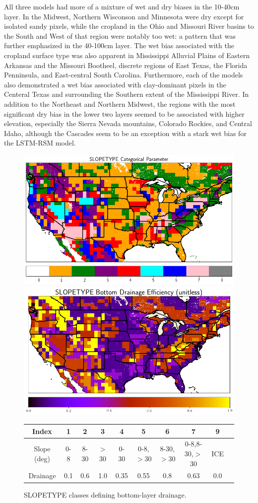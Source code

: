 All three models had more of a mixture of wet and dry biases in the 10-40cm layer. In the Midwest, Northern Wisconson and Minnesota were dry except for isolated sandy pixels, while the cropland in the Ohio and Missouri River basins to the South and West of that region were notably too wet: a pattern that was further emphasized in the 40-100cm layer. The wet bias associated with the cropland surface type was also apparent in Mississippi Alluvial Plains of Eastern Arkansas and the Missouri Bootheel, discrete regions of East Texas, the Florida Penninsula, and East-central South Carolina. Furthermore, each of the models also demonstrated a wet bias associated with clay-dominant pixels in the Centeral Texas and surrounding the Southern extent of the Mississippi River. In addition to the Northeast and Northern Midwest, the regions with the most significant dry bias in the lower two layers seemed to be associated with higher elevation, especially the Sierra Nevada mountains, Colorado Rockies, and Central Idaho, although the Cascades seem to be an exception with a stark wet bias for the LSTM-RSM model.

\begin{figure}[h!]
    \centering
    \includegraphics[width=.48\linewidth,draft=false]{figures/static_slopetype_3km.png}
    \includegraphics[width=.48\linewidth,draft=false]{figures/static_drainage_3km.png}

    \small
    \begin{tabular}{c | c c c c c c c c c}
        Index & 1 & 2 & 3 & 4 & 5 & 6 & 7 & 9 \\
        \hline
        Slope (deg) & 0-8 & 8-30 & $>$30 & 0-30 & 0-8,$>$30 & 8-30,$>$30 & 0-8,8-30,$>$30 & ICE \\
        Drainage & 0.1 & 0.6 & 1.0 & 0.35 & 0.55 & 0.8 & 0.63 & 0.0 \\
    \end{tabular}

    \caption{SLOPETYPE classes defining bottom-layer drainage.}
    \label{slopetype-classes}
\end{figure}

